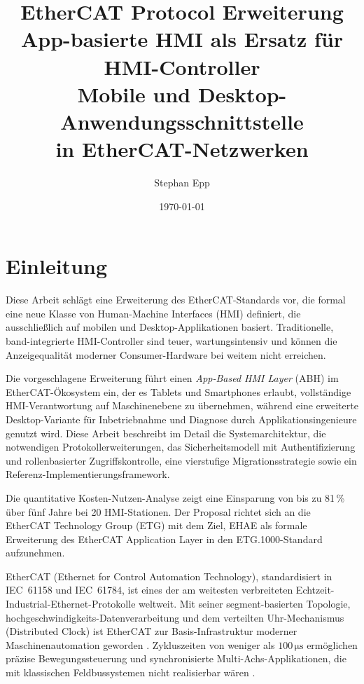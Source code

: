 ﻿\documentclass[12pt,a4paper]{article}
\title{
  \textbf{\LARGE EtherCAT Protocol Erweiterung}\\
  \textbf{\Large App-basierte HMI als Ersatz für HMI-Controller}\\[0.4cm]
  \large Mobile und Desktop-Anwendungsschnittstelle\\
   in EtherCAT-Netzwerken\\[0.3cm]
}
\author{Stephan Epp}
\date{\today}
\begin{document}
\maketitle
\thispagestyle{empty}


\tableofcontents
\newpage

\section{Einleitung}
\label{sec:intro}
Diese Arbeit schlägt eine Erweiterung des EtherCAT-Standards vor, die formal eine neue
Klasse von Human-Machine Interfaces (HMI) definiert, die ausschlie\ss{}lich auf mobilen und
Desktop-Applikationen basiert. Traditionelle, band-integrierte HMI-Controller sind teuer,
wartungsintensiv und können die Anzeigequalität moderner Consumer-Hardware bei weitem
nicht erreichen.

Die vorgeschlagene Erweiterung führt einen \emph{App-Based HMI Layer} (ABH) im
EtherCAT-Ökosystem ein, der es Tablets und Smartphones erlaubt, vollständige
HMI-Verantwortung auf Maschinenebene zu übernehmen, während eine erweiterte
Desktop-Variante für Inbetriebnahme und Diagnose durch Applikationsingenieure genutzt
wird. Diese Arbeit beschreibt im Detail die Systemarchitektur, die notwendigen
Protokollerweiterungen, das Sicherheitsmodell mit Authentifizierung und rollenbasierter
Zugriffskontrolle, eine vierstufige Migrationsstrategie sowie ein Referenz-Implementierungsframework.

Die quantitative Kosten-Nutzen-Analyse zeigt eine Einsparung von bis zu 81\,\% über
fünf Jahre bei 20 HMI-Stationen. Der Proposal richtet sich an die EtherCAT Technology
Group (ETG) mit dem Ziel, EHAE als formale Erweiterung des EtherCAT Application Layer
in den ETG.1000-Standard aufzunehmen.

EtherCAT (Ethernet for Control Automation Technology), standardisiert in IEC~61158 und
IEC~61784, ist eines der am weitesten verbreiteten Echtzeit-Industrial-Ethernet-Protokolle
weltweit. Mit seiner segment-basierten Topologie, hochgeschwindigkeits-Datenverarbeitung
und dem verteilten Uhr-Mechanismus (Distributed Clock) ist EtherCAT zur Basis-Infra\-struk\-tur
moderner Maschinenautomation geworden \cite{iec61158}. Zykluszeiten von weniger als
$100\,\si{\micro\second}$ ermöglichen präzise Bewegungssteuerung und synchronisierte
Multi-Achs-Applikationen, die mit klassischen Feldbussystemen nicht realisierbar wären
\cite{etg_spec}.
\end{document}
